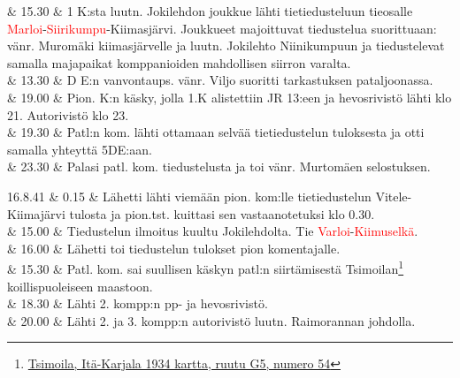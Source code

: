 \documentclass[11pt,a5paper,oneside]{book}
\begin{document}
& 15.30 & 1 K:sta luutn. Jokilehdon joukkue lähti tietiedusteluun tieosalle \textcolor{red}{Marloi}-\textcolor{red}{Siirikumpu}-Kiimasjärvi. \newline Joukkueet majoittuvat tiedustelua suorittuaan: vänr. Muromäki kiimasjärvelle ja luutn. Jokilehto Niinikumpuun ja tiedustelevat samalla majapaikat komppanioiden mahdollisen siirron varalta. \\

& 13.30 & D E:n vanvontaups. vänr. Viljo suoritti tarkastuksen pataljoonassa. \\

& 19.00 & Pion. K:n käsky, jolla 1.K alistettiin JR 13:een ja hevosrivistö lähti klo 21. Autorivistö klo 23. \\

& 19.30 & Patl:n kom. lähti ottamaan selvää tietiedustelun tuloksesta ja otti samalla yhteyttä 5DE:aan. \\

& 23.30 & Palasi patl. kom. tiedustelusta ja toi vänr. Murtomäen selostuksen. \\

\taulustop


16.8.41 & 0.15 & Lähetti lähti viemään pion. kom:lle tietiedustelun Vitele-Kiimajärvi tulosta ja pion.tst. kuittasi sen vastaanotetuksi klo 0.30. \\

& 15.00 & Tiedustelun ilmoitus kuultu Jokilehdolta. Tie \textcolor{red}{Varloi}-\textcolor{red}{Kiimuselkä}. \\

& 16.00 & Lähetti toi tiedustelun tulokset pion komentajalle. \\

& 15.30 & Patl. kom. sai suullisen käskyn patl:n siirtämisestä Tsimoilan\footnote{\href{https://www.google.fi/maps/place/61\%C2\%B013'40.5\%22N+32\%C2\%B044'50.1\%22E/@61.227911,32.7450663,906m/}{Tsimoila, Itä-Karjala 1934 kartta, ruutu G5, numero 54}} koillispuoleiseen maastoon. \\

& 18.30 & Lähti 2. kompp:n pp- ja hevosrivistö. \\

& 20.00 & Lähti 2. ja 3. kompp:n autorivistö luutn. Raimorannan johdolla. \newline \\
\end{document}
